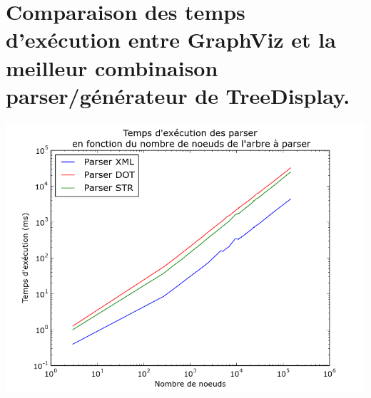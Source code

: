 	\section{Comparaison des temps d'exécution entre GraphViz et la meilleur combinaison parser/générateur de TreeDisplay.}
	
\begin{center}

\includegraphics[width=\columnwidth]{execTimeParsers}

\end{center}